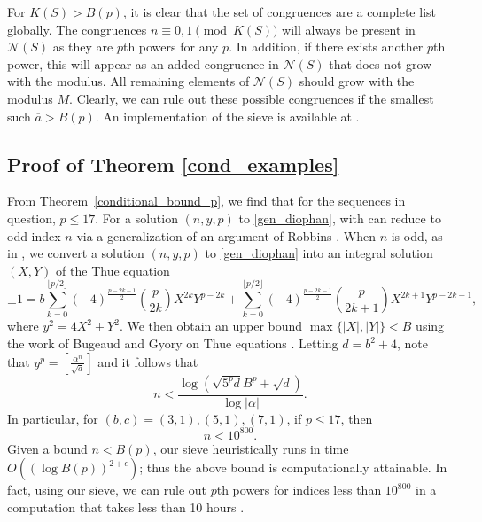 \documentclass[12pt]{amsart}
\theoremstyle{definition}
\theoremstyle{remark}
\def\N{{\mathcal N}}
\renewcommand{\bar}{\overline}
\begin{document}
For $K(S) > B(p)$, it is clear that the set of congruences are a complete list globally.  The congruences $n \equiv 0,1 \pmod{K(S)}$ will always be present in $\N(S)$ as they are $p$th powers for any $p$.  In addition, if there exists another $p$th power, this will appear as an added congruence in $\N(S)$ that does not grow with the modulus.  All remaining elements of $\N(S)$ should grow with the modulus $M$.  Clearly, we can rule out these possible congruences if the smallest such $\bar{a} > B(p)$.  An implementation of the sieve is available at \cite{code}.

\subsection{Proof of Theorem \ref{cond_examples}}

From Theorem~\ref{conditional_bound_p}, we find that for the sequences in question, $p\leq 17$.  For a solution $(n,y,p)$ to \eqref{gen_diophan}, with can reduce to odd index $n$ via a generalization of an argument of Robbins \cite{robbins83}.  When $n$ is odd, as in \cite{siksek06}, we convert a solution $(n,y,p)$ to \eqref{gen_diophan} into an integral solution $(X,Y)$ of the Thue equation \begin{equation}
\pm 1  =  b \sum_{k=0}^{\lfloor p/2 \rfloor} (-4)^{\frac{p-2k-1}{2}} {p\choose 2k} X^{2k}Y^{p-2k}  + \sum_{k=0}^{\lfloor p/2 \rfloor} (-4)^{\frac{p-2k-1}{2}} {p\choose 2k+1} X^{2k+1}Y^{p-2k-1},
\end{equation} where $y^2 = 4X^2 + Y^2$. We then obtain an upper bound $\max\{|X|, |Y|\} < B$ using the work of Bugeaud and Gyory on Thue equations \cite{bugeaud96}.  Letting $d = b^2+4$, note that $y^p = \left[ \frac{\alpha^n}{\sqrt{d}} \right]$ and it follows that
\begin{equation} n < \frac{\log\left(\sqrt{5^p d}B^p + \sqrt{d}\right)}{\log|\alpha|}. \end{equation}
In particular, for $(b,c) = (3,1), (5,1),(7,1)$, if $p\leq17$,  then \[ n < 10^{800}. \]
Given a bound $n < B(p)$, our sieve heuristically runs in time $O((\log B(p))^{2+\epsilon})$; thus the above bound is computationally attainable.  In fact, using our sieve, we can rule out $p$th powers for indices less than $10^{800}$ in a computation that takes less than 10 hours \cite{code}.











{}

\end{document}
